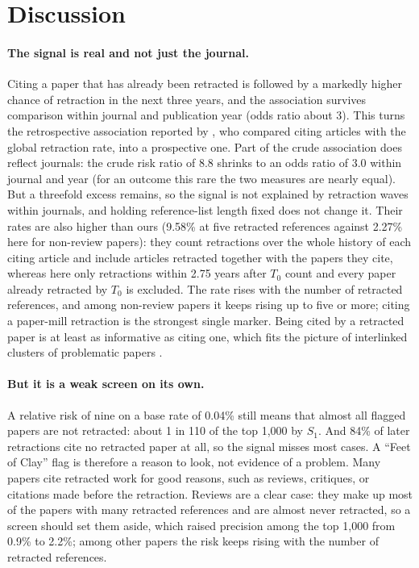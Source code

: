 \documentclass[pdflatex,sn-basic]{sn-jnl}
\begin{document}
\section{Discussion}\label{sec:discussion}

\paragraph{The signal is real and not just the journal.} Citing a paper that has already been retracted is followed by a
markedly higher chance of retraction in the next three years, and the association survives comparison within journal
and publication year (odds ratio about 3). This turns the retrospective association reported by
\citet{lou2026beyond}, who compared citing articles with the global retraction rate, into a prospective one. Part of
the crude association does reflect journals: the crude risk ratio of 8.8 shrinks to an odds ratio of 3.0 within journal
and year (for an outcome this rare the two measures are nearly equal). But a threefold excess remains, so the signal is not explained by retraction waves within journals, and holding
reference-list length fixed does not change it. Their rates are also higher than ours (9.58\% at five retracted
references against 2.27\% here for non-review papers): they count retractions over the whole history of each citing
article and include articles retracted together with the papers they cite, whereas here only retractions within 2.75
years after $T_0$ count and every paper already retracted by $T_0$ is excluded.
The rate rises with the number of retracted references, and among non-review papers it keeps rising up to five or
more; citing a paper-mill retraction is the strongest single marker. Being cited by a retracted paper is at least as informative as citing one, which fits the
picture of interlinked clusters of problematic papers \citep{candal2024references}.

\paragraph{But it is a weak screen on its own.} A relative risk of nine on a base rate of 0.04\% still means that almost
all flagged papers are not retracted: about 1 in 110 of the top 1,000 by $S_1$. And 84\% of later retractions cite no
retracted paper at all, so the signal misses most cases. A ``Feet of Clay'' flag is therefore a reason to look, not
evidence of a problem. Many papers cite retracted work for good reasons, such as reviews, critiques, or citations made
before the retraction. Reviews are a clear case: they make up most of the papers with many retracted references and are almost
never retracted, so a screen should set them aside, which raised precision among the top 1,000 from 0.9\% to 2.2\%; among other papers the risk keeps rising with the number of
retracted references.
\end{document}
